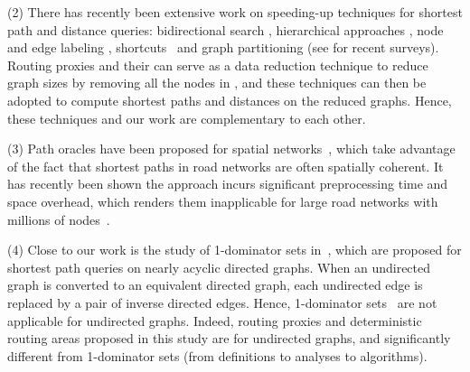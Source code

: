 \stab(2) There has recently been extensive work on speeding-up techniques for shortest  path and distance queries: bidirectional search \cite{LubyR89},
hierarchical approaches \cite{GeisbergerSSD08, arz2013transit}, node and edge labeling \cite{MohringSSWW05,SankaranarayananSA09}, shortcuts~\cite{SandersS05} and graph partitioning \cite{kl70,Karypis98,YangYZK12, delling2011graph} (see \cite{WuXDCZZ12,WagnerW07, bast2014route,delling2014robust} for recent surveys). Routing proxies and their \dras can serve as a data reduction technique to reduce graph sizes by removing all the nodes in \dras, and these techniques can then be adopted to compute shortest paths and distances on the reduced graphs. Hence, these techniques and our work are complementary to each other.



\stab(3) Path oracles have been proposed for spatial networks~\cite{SankaranarayananSA09}, which take advantage of the fact that shortest paths in road
networks are often spatially coherent. It has recently been shown the approach incurs significant preprocessing time and space overhead, which renders them inapplicable for large road networks with millions of nodes~\cite{WuXDCZZ12}.



\stab(4) Close to our work is the study of 1-dominator sets in~\cite{SaundersT07}, which are proposed for shortest path queries on nearly acyclic directed graphs. When an undirected graph is converted to an equivalent directed graph, each undirected edge is replaced by a pair of inverse directed edges. Hence,
 1-dominator sets~\cite{SaundersT07} are not applicable for undirected graphs. Indeed, routing proxies and deterministic routing areas proposed in this study  are for undirected graphs,  and  significantly different from 1-dominator sets  (from definitions to analyses to algorithms).


